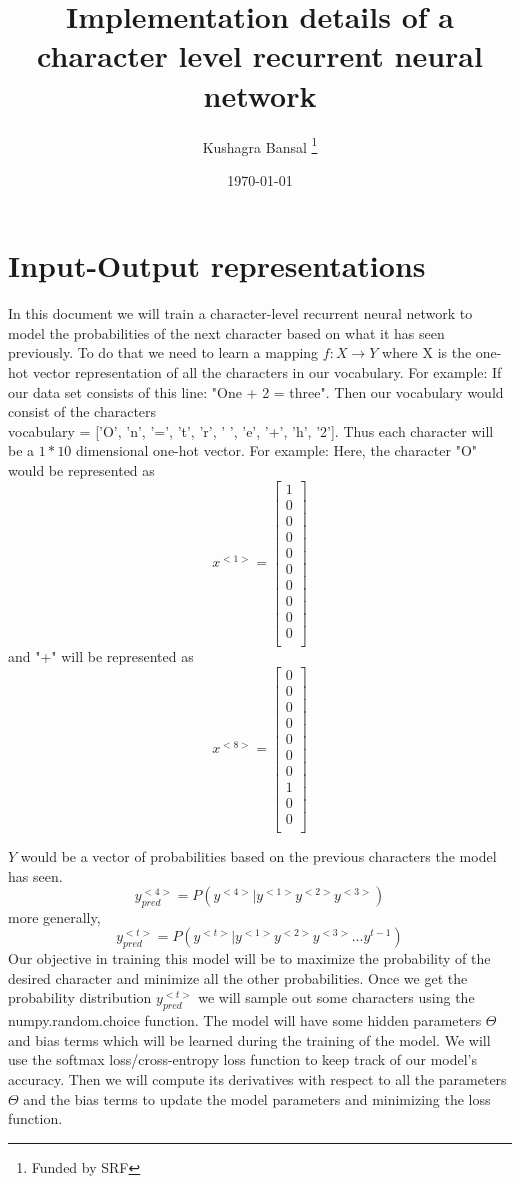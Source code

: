\documentclass[12pt,letterpaper]{article}
\title{Implementation details of a character level recurrent neural network}
\author{Kushagra Bansal \thanks {Funded by SRF}}
\date{\today}
\begin{document}
\maketitle
\section{Input-Output representations}
In this document we will train a character-level recurrent neural network to model the probabilities of the next character based on what it has seen previously. 
To do that we need to learn a mapping $f:X\rightarrow Y$ where X is the one-hot vector representation of all the characters in our vocabulary. 
For example:
If our data set consists of this line:
"One + 2 = three".
Then our vocabulary would consist of the characters\\ 
vocabulary = ['O', 'n', '=', 't', 'r', ' ', 'e', '+', 'h', '2'].
Thus each character will be a $1*10$ dimensional one-hot vector.
For example:
Here, the character "O" would be represented as
\[
x^{<1>} = \begin{bmatrix}
  1\\
  0\\
  0\\
  0\\
  0\\
  0\\
  0\\
  0\\
  0\\0\\
  \end{bmatrix}
\]
and "+" will be represented as
\[
x^{<8>} = \begin{bmatrix}
0\\
0\\
0\\
0\\
0\\
0\\
0\\
1\\
0\\
0\\
\end{bmatrix}
\]

$Y$ would be a vector of probabilities based on the previous characters the model has seen.
\[
y_{pred}^{<4>} = P(y^{<4>}|y^{<1>}y^{<2>}y^{<3>})
\]
more generally,
\[
y_{pred}^{<t>} = P(y^{<t>}|y^{<1>}y^{<2>}y^{<3>}...y^{t-1})
\]
Our objective in training this model will be to maximize the probability of the desired character and minimize all the other probabilities.
Once we get the probability distribution $y_{pred}^{<t>}$ we will sample out some characters using the numpy.random.choice function.
The model will have some hidden parameters $\Theta$ and bias terms which will be learned during the training of the model.
We will  use the softmax loss/cross-entropy loss function to keep track of our model's accuracy. Then we will compute its derivatives with respect to all the parameters $\Theta$ and the bias terms to update the model parameters and minimizing the loss function.
\end{document}

